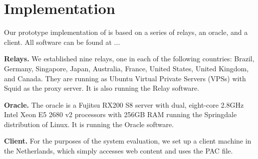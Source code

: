 \section{Implementation}
Our prototype implementation of \system{} is based on a series of relays, an oracle, and 
a client. All \system{} software can be found at ... 

{\bf Relays.}  We established nine relays, one in each of the following countries: Brazil, 
Germany, Singapore, Japan, Australia, France, United States, United Kingdom, and Canada.  
They are running as Ubuntu Virtual Private Servers (VPSs) with 
Squid as the proxy server.  It is also running the \system{} Relay software.

{\bf Oracle.}  The oracle is a Fujitsu RX200 S8 server with dual, 
eight-core 2.8GHz Intel Xeon E5 2680 v2 processors with 256GB RAM running the 
Springdale distribution of Linux. It is running the \system{} Oracle software.

{\bf Client.} For the purposes of the system evaluation, we set up a client 
machine in the Netherlands, which simply accesses web content and uses the PAC 
file.
